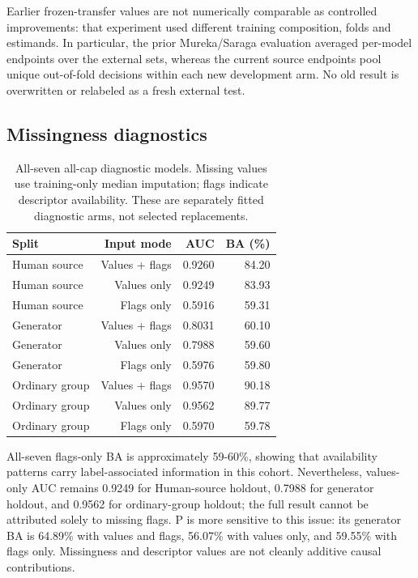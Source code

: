 Earlier frozen-transfer values are not numerically comparable as controlled improvements: that experiment used different training composition, folds and estimands. In particular, the prior Mureka/Saraga evaluation averaged per-model endpoints over the external sets, whereas the current source endpoints pool unique out-of-fold decisions within each new development arm. No old result is overwritten or relabeled as a fresh external test.

\subsection{Missingness diagnostics}

\begin{table}[htbp]
\centering\small
\begin{tabular}{@{}lrrr@{}}
\toprule
Split & Input mode & AUC & BA (\%) \\
\midrule
Human source & Values + flags & 0.9260 & 84.20 \\
Human source & Values only & 0.9249 & 83.93 \\
Human source & Flags only & 0.5916 & 59.31 \\
Generator & Values + flags & 0.8031 & 60.10 \\
Generator & Values only & 0.7988 & 59.60 \\
Generator & Flags only & 0.5976 & 59.80 \\
Ordinary group & Values + flags & 0.9570 & 90.18 \\
Ordinary group & Values only & 0.9562 & 89.77 \\
Ordinary group & Flags only & 0.5970 & 59.78 \\
\bottomrule
\end{tabular}
\caption{All-seven all-cap diagnostic models. Missing values use training-only median imputation; flags indicate descriptor availability. These are separately fitted diagnostic arms, not selected replacements.}
\end{table}

All-seven flags-only BA is approximately 59-60\%, showing that availability patterns carry label-associated information in this cohort. Nevertheless, values-only AUC remains 0.9249 for Human-source holdout, 0.7988 for generator holdout, and 0.9562 for ordinary-group holdout; the full result cannot be attributed solely to missing flags. P is more sensitive to this issue: its generator BA is 64.89\% with values and flags, 56.07\% with values only, and 59.55\% with flags only. Missingness and descriptor values are not cleanly additive causal contributions.

